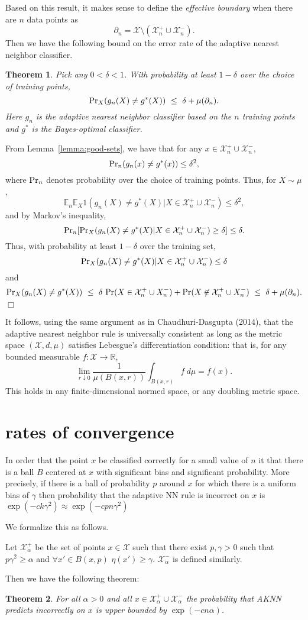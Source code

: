 \documentclass{article}
\def\R{{\mathbb{R}}}
\def\pr{{\rm Pr}}
\def\E{{\mathbb E}}
\def\X{{\mathcal X}}
\newtheorem{thm}{Theorem}
\newenvironment{proof}{\noindent {\sc Proof:}}{$\Box$ \medskip}
\begin{document}
Based on this result, it makes sense to define the {\it effective boundary} when there are $n$ data points as 
$$ \partial_n = \X \setminus (\X^+_n \cup \X^-_n) .$$
Then we have the following bound on the error rate of the adaptive nearest neighbor classifier.
\begin{thm}
Pick any $0 < \delta < 1$. With probability at least $1-\delta$ over the choice of training points,
$$ \pr_{X}(g_n(X) \neq g^*(X)) \ \leq \ \delta + \mu(\partial_n) .$$
Here $g_n$ is the adaptive nearest neighbor classifier based on the $n$ training points and $g^*$ is the Bayes-optimal classifier. 
\label{thm:general-error-bound}
\end{thm}
\begin{proof}
From Lemma~\ref{lemma:good-sets}, we have that for any $x \in \X^+_n \cup \X^-_n$, 
$$ \pr_n(g_n(x) \neq g^*(x)) \leq \delta^2 ,$$
where $\pr_n$ denotes probability over the choice of training points. Thus, for $X \sim \mu$,
$$ \E_n \E_X 1(g_n(X) \neq g^*(X) | X \in \X^+_n \cup \X^-_n) \leq \delta^2 ,$$
and by Markov's inequality,
$$ \pr_n [\pr_X (g_n(X) \neq g^*(X) |  X \in \X^+_n \cup \X^-_n) \geq \delta] \leq \delta.$$
Thus, with probability at least $1-\delta$ over the training set,
$$\pr_X (g_n(X) \neq g^*(X) |  X \in \X^+_n \cup \X^-_n) \leq \delta$$
and
$$ \pr_X(g_n(X) \neq g^*(X)) 
\ \leq \ \delta \ \pr(X \in \X^+_n \cup X^-_n) + \pr(X \not\in \X^+_n \cup X^-_n)
\ \leq \ \delta + \mu(\partial_n) .$$
\end{proof}

It follows, using the same argument as in Chaudhuri-Dasgupta (2014), that the adaptive nearest neighbor rule is universally consistent as long as the metric space $(\X, d, \mu)$ satisfies Lebesgue's differentiation condition: that is, for any bounded measurable $f: \X \rightarrow \R$,
$$ \lim_{r \downarrow 0} \frac{1}{\mu(B(x,r))} \int_{B(x,r)} f \ d\mu = f(x) .$$
This holds in any finite-dimensional normed space, or any doubling metric space.

\section{rates of convergence}

In order that the point $x$ be classified correctly for a small value of $n$ it that there is a ball $B$ centered at $x$ with significant bias and significant probability. More precisely, if there is a ball of probability $p$ around $x$ for which there is a uniform bias of $\gamma$ then probability that the adaptive NN rule is incorrect 
on $x$ is $\exp(-c k \gamma^2) \approx \exp(-c p n \gamma^2)$

We formalize this as follows.

Let $\X_{\alpha}^+$ be the set of points $x \in \X$ such that there exist $p,\gamma>0$ such that $p \gamma^2 \geq \alpha$ and  $\forall x' \in B(x,p)$ $\eta(x')\geq \gamma$. $\X_{\alpha}^-$ is defined similarly.

Then we have the following theorem:
\begin{thm}
For all $\alpha>0$ and all $x \in \X_{\alpha}^+ \cup \X_{\alpha}^-$ the probability that AKNN predicts incorrectly on $x$ is upper bounded by $\exp(-c n \alpha)$.
\end{thm}
\end{document}
